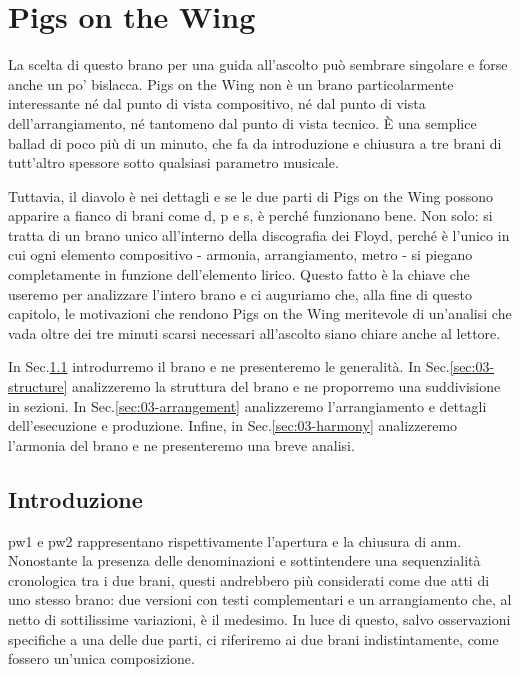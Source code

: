 \documentclass[class=book, crop=false, oneside, 12pt]{standalone}
\begin{document}
    \chapter{Pigs on the Wing}
    La scelta di questo brano per una guida all'ascolto può sembrare singolare e forse anche un po' bislacca. Pigs on the Wing non è un brano particolarmente interessante né dal punto di vista compositivo, né dal punto di vista dell'arrangiamento, né tantomeno dal punto di vista tecnico. È una semplice ballad di poco più di un minuto, che fa da introduzione e chiusura a tre brani di tutt'altro spessore sotto qualsiasi parametro musicale.

    Tuttavia, il diavolo è nei dettagli e se le due parti di Pigs on the Wing possono apparire a fianco di brani come \acrshort{d}, \acrshort{p} e \acrshort{s}, è perché funzionano bene. Non solo: si tratta di un brano unico all'interno della discografia dei Floyd, perché è l'unico in cui ogni elemento compositivo - armonia, arrangiamento, metro - si piegano completamente in funzione dell'elemento lirico. Questo fatto è la chiave che useremo per analizzare l'intero brano e ci auguriamo che, alla fine di questo capitolo, le motivazioni che rendono Pigs on the Wing meritevole di un'analisi che vada oltre dei tre minuti scarsi necessari all'ascolto siano chiare anche al lettore.

    In Sec.\ref{sec:03-intro} introdurremo il brano e ne presenteremo le generalità. In Sec.\ref{sec:03-structure} analizzeremo la struttura del brano e ne proporremo una suddivisione in sezioni. In Sec.\ref{sec:03-arrangement} analizzeremo l'arrangiamento e dettagli dell'esecuzione e produzione. Infine, in Sec.\ref{sec:03-harmony} analizzeremo l'armonia del brano e ne presenteremo una breve analisi.

    \section{Introduzione}
    \label{sec:03-intro}
    \acrfull{pw1} e \acrfull{pw2} rappresentano rispettivamente l'apertura e la chiusura di \acrshort{anm}. Nonostante la presenza delle denominazioni  e  sottintendere una sequenzialità cronologica tra i due brani, questi andrebbero più considerati come due atti di uno stesso brano: due versioni con testi complementari e un arrangiamento che, al netto di sottilissime variazioni, è il medesimo. In luce di questo, salvo osservazioni specifiche a una delle due parti, ci riferiremo ai due brani indistintamente, come fossero un'unica composizione.
\end{document}
